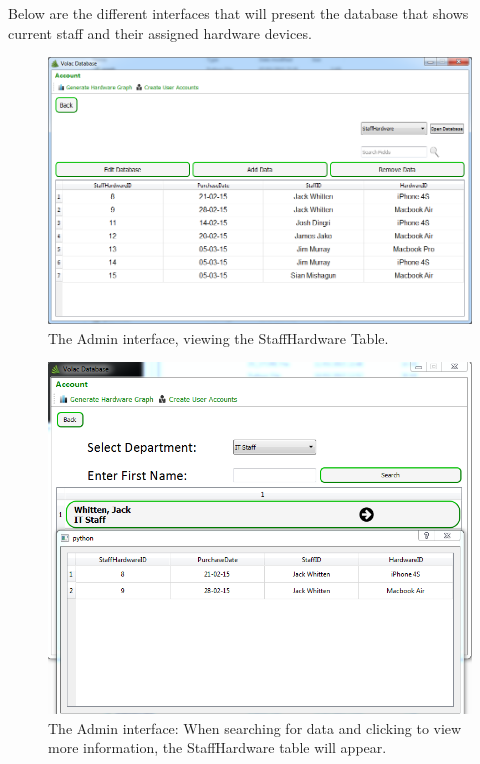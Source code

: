 Below are the different interfaces that will present the database that shows current staff and their assigned hardware devices.

\begin{figure}[H]
    \includegraphics[width=\textwidth]{./Evaluation/Images/Database1.png}
    \caption{The Admin interface, viewing the StaffHardware Table.} \label{fig:db1}
\end{figure}

\begin{figure}[H]
    \includegraphics[width=\textwidth]{./Evaluation/Images/database3.png}
    \caption{The Admin interface: When searching for data and clicking to view more information, the StaffHardware table will appear.} \label{fig:db2}
\end{figure}

